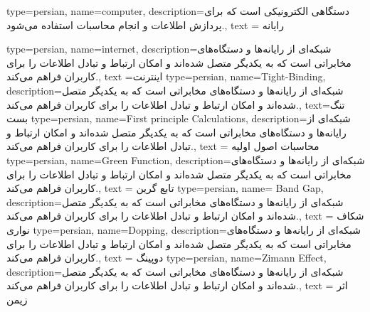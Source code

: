 {
    type=persian,
    name={computer},
    description={دستگاهی الکترونیکی است که برای پردازش اطلاعات و انجام محاسبات استفاده می‌شود.},
    text = {رایانه}
}

{
    type=persian,
    name={internet},
    description={شبکه‌ای از رایانه‌ها و دستگاه‌های مخابراتی است که به یکدیگر متصل شده‌اند و امکان ارتباط و تبادل اطلاعات را برای کاربران فراهم می‌کند.},
    text ={اینترنت}
}
{
    type=persian,
    name={Tight-Binding},
    description={شبکه‌ای از رایانه‌ها و دستگاه‌های مخابراتی است که به یکدیگر متصل شده‌اند و امکان ارتباط و تبادل اطلاعات را برای کاربران فراهم می‌کند.},
    text={تنگ بست}
}
{
    type=persian,
    name={First principle Calculations},
    description={شبکه‌ای از رایانه‌ها و دستگاه‌های مخابراتی است که به یکدیگر متصل شده‌اند و امکان ارتباط و تبادل اطلاعات را برای کاربران فراهم می‌کند.},
    text = {محاسبات اصول اولیه}
}
{
    type=persian,
    name={Green Function},
    description={شبکه‌ای از رایانه‌ها و دستگاه‌های مخابراتی است که به یکدیگر متصل شده‌اند و امکان ارتباط و تبادل اطلاعات را برای کاربران فراهم می‌کند.},
    text = {تابع گرین}
}
{
    type=persian,
    name= {Band Gap},
    description={شبکه‌ای از رایانه‌ها و دستگاه‌های مخابراتی است که به یکدیگر متصل شده‌اند و امکان ارتباط و تبادل اطلاعات را برای کاربران فراهم می‌کند.},
    text = {شکاف نواری}
}
{
    type=persian,
    name={Dopping},
    description={شبکه‌ای از رایانه‌ها و دستگاه‌های مخابراتی است که به یکدیگر متصل شده‌اند و امکان ارتباط و تبادل اطلاعات را برای کاربران فراهم می‌کند.},
    text = {دوپینگ}
}
{
    type=persian,
    name={Zimann Effect},
    description={شبکه‌ای از رایانه‌ها و دستگاه‌های مخابراتی است که به یکدیگر متصل شده‌اند و امکان ارتباط و تبادل اطلاعات را برای کاربران فراهم می‌کند.},
    text = {اثر زیمن}
}